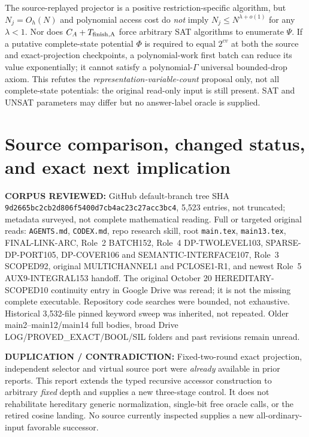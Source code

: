 \documentclass[11pt]{article}
\begin{document}
The source-replayed projector is a positive restriction-specific algorithm, but \(N_j=O_h(N)\) and polynomial access cost do \emph{not} imply \(N_j\le N^{\lambda+o(1)}\) for any \(\lambda<1\).  Nor does \(C_A+T_{\rm finish,A}\) force arbitrary SAT algorithms to enumerate \(\Psi\).  If a putative complete-state potential \(\Phi\) is required to equal \(2^{cv}\) at both the source and exact-projection checkpoints, a polynomial-work first batch can reduce its value exponentially; it cannot satisfy a polynomial-\(\Gamma\) universal bounded-drop axiom.  This refutes the \emph{representation-variable-count} proposal only, not all complete-state potentials: the original read-only input is still present.  SAT and UNSAT parameters may differ but no answer-label oracle is supplied.

\section{Source comparison, changed status, and exact next implication}
\textbf{CORPUS REVIEWED:} GitHub default-branch tree SHA \texttt{9d2665bc2cb2d806f5400d7cb4ac23c27acc3bc4}, 5,523 entries, not truncated; metadata surveyed, not complete mathematical reading.  Full or targeted original reads: \texttt{AGENTS.md}, \texttt{CODEX.md}, repo research skill, root \texttt{main.tex}, \texttt{main13.tex}, FINAL-LINK-ARC, Role~2 BATCH152, Role~4 DP-TWOLEVEL103, SPARSE-DP-PORT105, DP-COVER106 and SEMANTIC-INTERFACE107, Role~3 SCOPED92, original MULTICHANNEL1 and PCLOSE1-R1, and newest Role~5 AUX9-INTEGRAL153 handoff.  The original October 20 HEREDITARY-SCOPED10 continuity entry in Google Drive was reread; it is not the missing complete executable.  Repository code searches were bounded, not exhaustive.  Historical 3,532-file pinned keyword sweep was inherited, not repeated.  Older main2--main12/main14 full bodies, broad Drive LOG/PROVED\_EXACT/BOOL/SIL folders and past revisions remain unread.

\textbf{DUPLICATION / CONTRADICTION:} Fixed-two-round exact projection, independent selector and virtual source port were \emph{already} available in prior reports.  This report extends the typed recursive accessor construction to arbitrary \emph{fixed} depth and supplies a new three-stage control.  It does not rehabilitate hereditary generic normalization, single-bit free oracle calls, or the retired cosine landing.  No source currently inspected supplies a new all-ordinary-input favorable successor.
\end{document}
